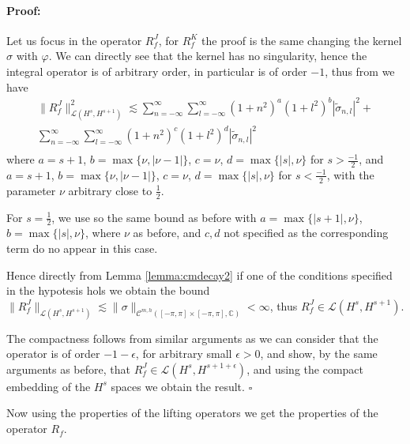 \documentclass{article}
\newenvironment{proof}{\paragraph{Proof:}}{\hfill$\square$}
\newcommand{\IC}{{\mathbb C}}
\newcommand{\cmspaceh}[4]{\mathcal{C}^{#1,#2} \left( #3, #4 \right)}
\begin{document}
\begin{proof}
Let us focus in the operator $R_f^J$, for $R_f^K$ the proof is the same changing the kernel $\sigma$ with $\varphi$. We can directly see that the kernel has no singularity, hence the integral operator is of arbitrary order, in particular is of order $-1$, thus from \cite[Theorem 6.1.3]{saranen2013periodic} we have 
\begin{align*}
\| R^J_f\|_{ \mathcal{L}(H^{s},H^{s+1})}^2 \lesssim \sum_{n=-\infty}^\infty \sum_{l=-\infty}^\infty  (1+n^2)^{a}(1+l^2)^{b}|\widetilde{\sigma}_{n,l}|^2+\\
\sum_{n=-\infty}^\infty \sum_{l=-\infty}^\infty  (1+n^2)^{c}(1+l^2)^{d}|\widetilde{\sigma}_{n,l}|^2\\
\end{align*}
where $a=s+1$, $b = \max\{\nu, |\nu-1|\}$, $c = \nu $, $d= \max \{ |s|,\nu\}$ for $s > \frac{-1}{2}$, and $a=s+1$, $b = \max\{\nu, |\nu-1|\}$, $c = \nu $, $d= \max \{ |s|,\nu\}$ for $s <\frac{-1}{2}$, with the parameter $\nu$ arbitrary close to $\frac{1}{2}$.

For $s=\frac{1}{2}$, we use \cite[Theorem 6.1.1]{saranen2013periodic} so the same bound as before with $a =\max\{ |s+1|,\nu\}$, $b=\max\{|s|,\nu\}$, where $\nu$ as before, and $c,d$ not specified as the corresponding term do no appear in this case.

Hence directly from Lemma \ref{lemma:cmdecay2} if one of the conditions specified in the hypotesis hols we obtain the bound $\| R_f^J\|_{ \mathcal{L}(H^{s},H^{s+1})} \lesssim \|\sigma\|_{\cmspaceh{m}{h}{[-\pi,\pi]\times[-\pi,\pi]}{\IC}} < \infty$, thus  
$R_f^J \in \mathcal{L}(H^{s},H^{s+1})$.

The compactness follows from similar arguments as we can consider that the operator  is of order $-1-\epsilon$, for arbitrary small $\epsilon>0$, and show, by the same arguments as before, that $R_f^J \in \mathcal{L}\left(H^s,H^{s+1+\epsilon}\right)$, and using the compact embedding of the $H^{s}$ spaces we obtain the result.
\end{proof}

Now using the properties of the lifting operators we get the properties of the operator $R_f$. 
\end{document}
